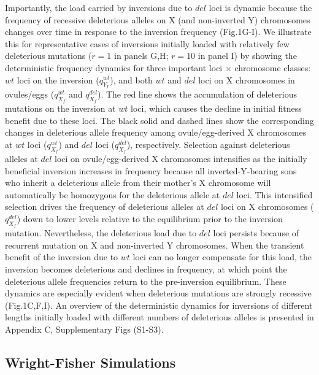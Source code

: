 \documentclass[11pt]{article}
\begin{document}
Importantly, the load carried by inversions due to $del$ loci is dynamic because the frequency of recessive deleterious alleles on X (and non-inverted Y) chromosomes changes over time in response to the inversion frequency (Fig.1G-I). We illustrate this for representative cases of inversions initially loaded with relatively few deleterious mutations ($r = 1$ in panels G,H; $r = 10$ in panel I) by showing the deterministic frequency dynamics for three important loci $\times$ chromosome classes: $wt$ loci on the inversion ($q_{Y_I}^{wt}$), and both $wt$ and $del$ loci on X chromosomes in ovules/eggs ($q_{X_f}^{wt}$ and $q_{X_f}^{del}$). The red line shows the accumulation of deleterious mutations on the inversion at $wt$ loci, which causes the decline in initial fitness benefit due to these loci. The black solid and dashed lines show the corresponding changes in deleterious allele frequency among ovule/egg-derived X chromosomes at $wt$ loci ($q_{X_f}^{wt}$) and $del$ loci ($q_{X_f}^{del}$), respectively. Selection against deleterious alleles at $del$ loci on ovule/egg-derived X chromosomes intensifies as the initially beneficial inversion increases in frequency because all inverted-Y-bearing sons who inherit a deleterious allele from their mother’s X chromosome will automatically be homozygous for the deleterious allele at $del$ loci. This intensified selection drives the frequency of deleterious alleles at $del$ loci on X chromosomes ($q_{X_f}^{del}$) down to lower levels relative to the equilibrium prior to the inversion mutation. Nevertheless, the deleterious load due to $del$ loci persists because of recurrent mutation on X and non-inverted Y chromosomes.  When the transient benefit of the inversion due to $wt$ loci can no longer compensate for this load, the inversion becomes deleterious and declines in frequency, at which point the deleterious allele frequencies return to the pre-inversion equilibrium. These dynamics are especially evident when deleterious mutations are strongly recessive (Fig.1C,F,I). An overview of the deterministic dynamics for inversions of different lengths initially loaded with different numbers of deleterious alleles is presented in Appendix C, Supplementary Figs (S1-S3).

\subsection*{Wright-Fisher Simulations}
\end{document}
